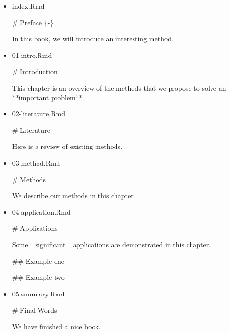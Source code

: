 \documentclass[
]{book}
\newenvironment{Shaded}{\begin{snugshade}}{\end{snugshade}}
\newcommand{\FunctionTok}[1]{\textcolor[rgb]{0.00,0.00,0.00}{#1}}
\newcommand{\NormalTok}[1]{#1}
\begin{document}
\begin{itemize}
\item
  index.Rmd

\begin{Shaded}
\begin{Highlighting}[]
\FunctionTok{\# Preface \{{-}\}}

\NormalTok{In this book, we will introduce an interesting}
\NormalTok{method.}
\end{Highlighting}
\end{Shaded}
\item
  01-intro.Rmd

\begin{Shaded}
\begin{Highlighting}[]
\FunctionTok{\# Introduction}

\NormalTok{This chapter is an overview of the methods that}
\NormalTok{we propose to solve an **important problem**.}
\end{Highlighting}
\end{Shaded}
\item
  02-literature.Rmd

\begin{Shaded}
\begin{Highlighting}[]
\FunctionTok{\# Literature}

\NormalTok{Here is a review of existing methods.}
\end{Highlighting}
\end{Shaded}
\item
  03-method.Rmd

\begin{Shaded}
\begin{Highlighting}[]
\FunctionTok{\# Methods}

\NormalTok{We describe our methods in this chapter.}
\end{Highlighting}
\end{Shaded}
\item
  04-application.Rmd

\begin{Shaded}
\begin{Highlighting}[]
\FunctionTok{\# Applications}

\NormalTok{Some \_significant\_ applications are demonstrated}
\NormalTok{in this chapter.}

\FunctionTok{\#\# Example one}

\FunctionTok{\#\# Example two}
\end{Highlighting}
\end{Shaded}
\item
  05-summary.Rmd

\begin{Shaded}
\begin{Highlighting}[]
\FunctionTok{\# Final Words}

\NormalTok{We have finished a nice book.}
\end{Highlighting}
\end{Shaded}
\end{itemize}
\end{document}
